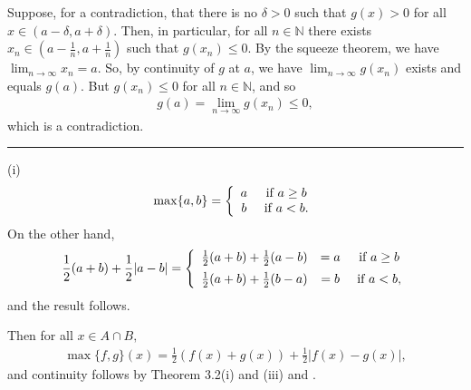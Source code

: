 \documentclass[letterpaper,10pt,english]{jupyterBook}
\begin{document}
\sphinxAtStartPar
{}
Suppose, for a contradiction, that  there is no  \(\delta > 0\) such that \(g(x) > 0\)  for all \( x \in (a - \delta, a + \delta)\). Then, in particular, for all \(n\in\mathbb{N}\) there exists \(x_{n} \in \left(a - \frac{1}{n}, a + \frac{1}{n}\right)\) such that \(g(x_{n}) \leq 0\). By the squeeze theorem, we have \(\lim_{n\rightarrow\infty} x_{n} = a\). So, by continuity of \(g\) at \(a\), we have \(\lim_{n\rightarrow\infty} g(x_{n})\) exists and equals \(g(a)\). But \(g(x_n)\leq 0\) for all \(n\in\mathbb{N}\), and so
\begin{equation*}
\begin{split}
g(a)=\lim_{n\rightarrow\infty} g(x_{n}) \leq 0,
\end{split}
\end{equation*}
\sphinxAtStartPar
which is a contradiction.


\bigskip\hrule\bigskip


\sphinxAtStartPar
{\hyperref[\detokenize{Problems:id20}]{}}
(i)
\begin{equation*}
\begin{split}
\max\{a, b\} = \left\{\begin{array}{c c} a & ~\mbox{if}~a \geq b\\
b & ~\mbox{if}~a < b.\\ \end{array} \right.
\end{split}
\end{equation*}
\sphinxAtStartPar
On the other hand,
\begin{equation*}
\begin{split}
\frac{1}{2}( a+b) + \frac{1}{2}|a-b| = \left\{\begin{array}{c c c} \frac{1}{2}(a+b) + \frac{1}{2}(a- b) & = a & ~\mbox{if}~a \geq b\\[.5em]
\frac{1}{2}(a+b) + \frac{1}{2}(b- a) &=  b & ~\mbox{if}~a < b,\\ \end{array} \right.
\end{split}
\end{equation*}
\sphinxAtStartPar
and the result follows.

\sphinxAtStartPar
Then for all \(x \in A\cap B,\)
\begin{equation*}
\begin{split}
\max\{f, g\}(x) = \frac{1}{2}(f(x) + g(x)) + \frac{1}{2}|f(x) - g(x)|,
\end{split}
\end{equation*}
\sphinxAtStartPar
and continuity follows by Theorem  3.2(i) and (iii) and {\hyperref[\detokenize{Problems:id14}]{}}.
\end{document}
